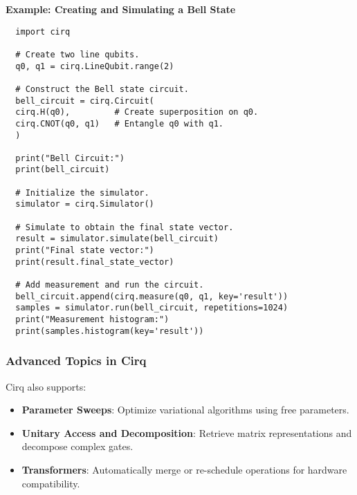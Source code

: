 \textbf{Example: Creating and Simulating a Bell State}
\begin{verbatim}
  import cirq

  # Create two line qubits.
  q0, q1 = cirq.LineQubit.range(2)

  # Construct the Bell state circuit.
  bell_circuit = cirq.Circuit(
  cirq.H(q0),         # Create superposition on q0.
  cirq.CNOT(q0, q1)   # Entangle q0 with q1.
  )

  print("Bell Circuit:")
  print(bell_circuit)

  # Initialize the simulator.
  simulator = cirq.Simulator()

  # Simulate to obtain the final state vector.
  result = simulator.simulate(bell_circuit)
  print("Final state vector:")
  print(result.final_state_vector)

  # Add measurement and run the circuit.
  bell_circuit.append(cirq.measure(q0, q1, key='result'))
  samples = simulator.run(bell_circuit, repetitions=1024)
  print("Measurement histogram:")
  print(samples.histogram(key='result'))
\end{verbatim}

\subsubsection*{Advanced Topics in Cirq}

Cirq also supports:

\begin{itemize}

  \item \textbf{Parameter Sweeps}: Optimize variational algorithms using free
    parameters.

  \item \textbf{Unitary Access and Decomposition}: Retrieve matrix
    representations and decompose complex gates.

  \item \textbf{Transformers}: Automatically merge or re-schedule operations
    for hardware compatibility.

\end{itemize}

